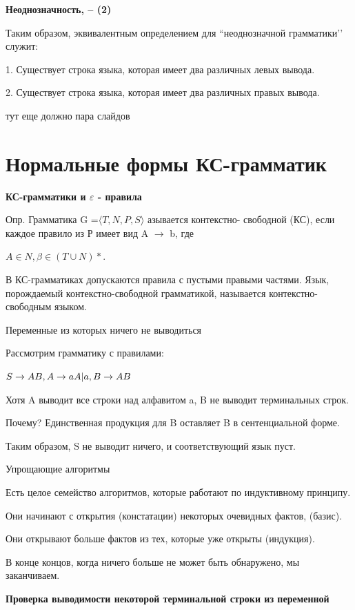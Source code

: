 \documentclass{article}
\begin{document}
\textbf{Неоднозначность, – (2)}


Таким образом, эквивалентным определением для
“неоднозначной грамматики’’ служит:

1. Существует строка языка, которая имеет два различных левых вывода.

2. Существует строка языка, которая имеет два различных правых
вывода.


тут еще должно пара слайдов


\section{Нормальные формы КС-грамматик}

\textbf{КС-грамматики и $\varepsilon$ - правила}

Опр. Грамматика G =$\langle  T, N, P, S \rangle $ азывается контекстно-
свободной (КС), если каждое правило из Р имеет вид A $\to$ b, где

$A \in N, \beta \in ( T \cup N )*.$

В КС-грамматиках допускаются правила с пустыми правыми
частями.
Язык, порождаемый контекстно-свободной грамматикой,
называется контекстно-свободным языком.


Переменные из которых ничего не выводиться

Рассмотрим грамматику с правилами:

$ S \rightarrow AB,
\vspace{3mm}
 A \rightarrow  aA | a,
\vspace{3mm}
 B \rightarrow AB$

 Хотя A выводит все строки над алфавитом {a}, B не выводит
терминальных строк.

 Почему? Единственная продукция для B оставляет B в сентенциальной
форме.

 Таким образом, S не выводит ничего, и соответствующий язык
пуст.


Упрощающие алгоритмы


Есть целое семейство алгоритмов, которые работают по
индуктивному принципу.

 Они начинают с открытия (констатации) некоторых
очевидных фактов, (базис).

 Они открывают больше фактов из тех, которые уже
открыты (индукция).

 В конце концов, когда ничего больше не может быть
обнаружено, мы заканчиваем.


\textbf{Проверка выводимости некоторой
терминальной строки из переменной}
\end{document}
